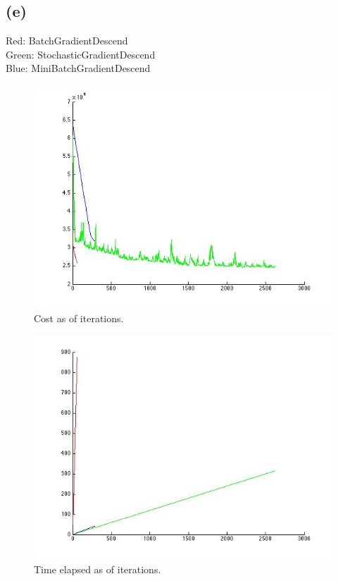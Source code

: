 \documentclass{article}
\begin{document}
\subsection{(e)}
Red: BatchGradientDescend \\ Green: StochasticGradientDescend \\ Blue: MiniBatchGradientDescend\\
\begin{figure}[H]
\centering
\includegraphics[scale=0.5]{q1e-cost.jpg}
\caption{ Cost as of iterations. }
\label{}
\end{figure}

\begin{figure}[H]
\centering
\includegraphics[scale=0.5]{q1e-time.jpg}
\caption{ Time elapsed as of iterations. }
\label{}
\end{figure}
\end{document}
